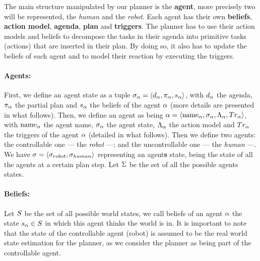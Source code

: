 \documentclass[a4paper,11pt,twoside]{StyleThese}
\begin{document}
The main structure manipulated by our planner is the \textbf{agent}, more precisely two will be represented, the \textit{human} and the \textit{robot}. Each agent has their own \textbf{beliefs}, \textbf{action model}, \textbf{agenda}, \textbf{plan} and \textbf{triggers}. The planner has to use their action models and beliefs to decompose the tasks in their agenda into primitive tasks (actions) that are inserted in their plan. By doing so, it also has to update the beliefs of each agent and to model their reaction by executing the triggers.

\paragraph{\bf Agents:}
First, we define an agent state as a tuple $\sigma_{\alpha} = \langle  d_{\alpha}, \pi_{\alpha}, s_{\alpha} \rangle$, with $d_{\alpha}$ the agenda, $\pi_{\alpha}$ the partial plan and $s_{\alpha}$ the beliefs of the agent $\alpha$ (more details are presented in what follows). Then, we define an agent as being $\alpha = \langle \text{name}_{\alpha}, \sigma_{\alpha}, \Lambda_{\alpha}, Tr_{\alpha} \rangle$, with $\text{name}_{\alpha}$ the agent name, $\sigma_{\alpha}$ the agent state, $\Lambda_{\alpha}$ the action model and $Tr_{\alpha}$ the triggers of the agent $\alpha$ (detailed in what follows). Then we define two agents: the controllable one --- the \textit{robot} ---; and the uncontrollable one --- the \textit{human} ---. We have $\sigma = \langle \sigma_{robot}, \sigma_{human} \rangle$ representing an agent\textbf{s} state, being the state of all the agents at a certain plan step. Let $\Sigma$ be the set of all the possible agents states.

\paragraph{\bf Beliefs:}
Let $S$ be the set of all possible world states, we call beliefs of an agent $\alpha$ the state $s_{\alpha} \in S$ in which this agent thinks the world is in. It is important to note that the state of the controllable agent (robot) is assumed to be the real world state estimation for the planner, as we consider the planner as being part of the controllable agent.
\end{document}
